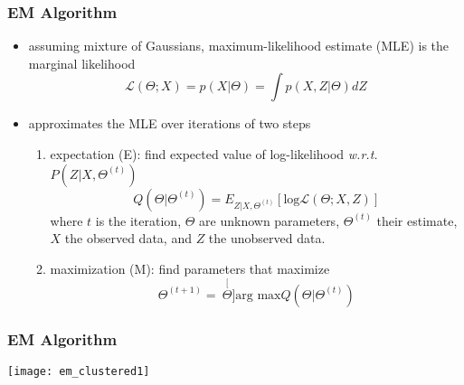 \begin{frame}
\frametitle{EM Algorithm}

\begin{itemize}
	\setlength{\itemindent}{-1em}
	\item assuming mixture of Gaussians, maximum-likelihood estimate (MLE) is the marginal likelihood
		\begin{equation}
			\mathcal{L}(\Theta; X) = p(X|\Theta) = \int p(X,Z|\Theta)dZ
		\end{equation}
	\item approximates the MLE over iterations of two steps 	\cite{wiki:em}
	\begin{enumerate}
		\setlength{\itemindent}{-2em}
		\item expectation (E): find expected value of log-likelihood \textit{w.r.t.} $P(Z|X,\Theta^{(t)})$
			\begin{equation}
				Q(\Theta|\Theta^{(t)}) = E_{Z|X,\Theta^{(t)}}[\text{log}\mathcal{L}(\Theta; X, Z)]
			\end{equation}
			where $t$ is the iteration, $\Theta$ are unknown parameters, $\Theta^{(t)}$ their estimate, $X$ the observed data, and $Z$ the unobserved data.
		\item maximization (M): find parameters that maximize
			\begin{equation}
				\Theta^{(t+1)} =\ \stackrel[\Theta]{}{\text{arg max}}Q(\Theta|\Theta^{(t)})
			\end{equation}
	\end{enumerate}
\end{itemize}

\end{frame}


\begin{frame}
\frametitle{EM Algorithm}

	{
	     \centering
	     \texttt{[image: em\_clustered1]}
		\vfill
	}


\end{frame}